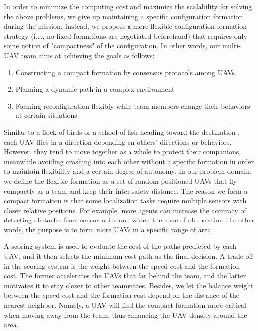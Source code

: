 In order to minimize the computing cost and maximize the scalability for solving the above problems, we give up maintaining a specific configuration formation during the mission. Instead, we propose a more flexible configuration formation strategy (i.e., no fixed formations are negotiated beforehand) that requires only some notion of "compactness" of the configuration. In other words, our multi-UAV team aims at achieving the goals as follows:
\begin{enumerate}
\item Constructing a compact formation by consensus protocols among UAVs
\item Planning a dynamic path in a complex environment
\item Forming reconfiguration flexibly while team members change their behaviors at certain situations
\end{enumerate}

Similar to a flock of birds or a school of fish heading toward the destination \citep{hubbard2004model}, each UAV flies in a direction depending on others' directions or behaviors. However, they tend to move together as a whole to protect their companions, meanwhile avoiding crashing into each other without a specific formation in order to maintain flexibility and a certain degree of autonomy. In our problem domain, we define the flexible formation as a set of random-positioned UAVs that fly compactly as a team and keep their inter-safety distance. The reason we form a compact formation is that some localization tasks require multiple sensors with closer relative positions. For example, more agents can increase the accuracy of detecting obstacles from sensor noise and widen the cone of observation \citep{anderson2008uav}. In other words, the purpose is to form more UAVs in a specific range of area.

A scoring system is used to evaluate the cost of the paths predicted by each UAV, and it then selects the minimum-cost path as the final decision. A trade-off in the scoring system is the weight between the speed cost and the formation cost. The former accelerates the UAVs that far behind the team, and the latter motivates it to stay closer to other teammates. Besides, we let the balance weight between the speed cost and the formation cost depend on the distance of the nearest neighbor. Namely, a UAV will find the compact formation more critical when moving away from the team, thus enhancing the UAV density around the area.

